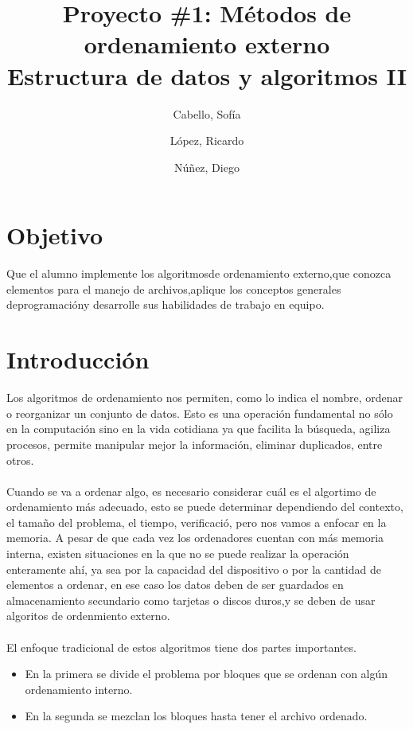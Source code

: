 \documentclass[11pt]{article}
\title{Proyecto \#1: Métodos de ordenamiento externo \\
Estructura de datos y algoritmos II}
\author{Cabello, Sofía
\and López, Ricardo
\and Núñez, Diego}
\begin{document}
\maketitle{}
\section{Objetivo}
Que el alumno implemente los algoritmosde ordenamiento externo,que conozca elementos para el manejo de archivos,aplique los conceptos generales deprogramacióny desarrolle sus habilidades de trabajo en equipo.

\section{Introducción}
Los algoritmos de ordenamiento nos permiten, como lo indica el nombre, ordenar o reorganizar un conjunto de datos. Esto es una operación fundamental no sólo en la computación sino en la vida cotidiana ya que facilita la búsqueda, agiliza procesos, permite manipular mejor la información, eliminar duplicados, entre otros. 

\paragraph{}
Cuando se va a ordenar algo, es necesario considerar cuál es el algortimo de ordenamiento más adecuado, esto se puede determinar dependiendo del contexto, el tamaño del problema, el tiempo, verificació, pero nos vamos a enfocar en la memoria. A pesar de que cada vez los ordenadores cuentan con más memoria interna, existen situaciones en la que no se puede realizar la operación enteramente ahí, ya sea por la capacidad del dispositivo o por la cantidad de elementos a ordenar, en ese caso los datos deben de ser guardados en almacenamiento secundario como tarjetas o discos duros,y se deben de usar algoritos de ordenmiento externo. 


\paragraph{}
El enfoque tradicional de estos algoritmos tiene dos partes importantes. 

\begin{itemize}
\item 
En la primera se divide el problema por bloques que se ordenan con algún ordenamiento interno.
\item
En la segunda se mezclan los bloques hasta tener el archivo ordenado. 
\end{itemize}
\end{document}
